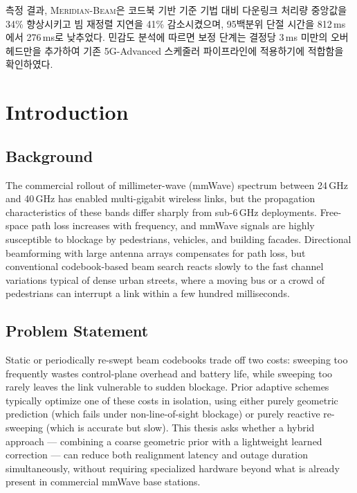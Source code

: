 \documentclass[12pt,a4paper]{report}
\begin{document}
\vspace{0.3cm}
\noindent 측정 결과, \textsc{Meridian-Beam}은 코드북 기반 기준 기법 대비
다운링크 처리량 중앙값을 34\% 향상시키고 빔 재정렬 지연을 41\% 감소시켰으며,
95백분위 단절 시간을 812\,ms에서 276\,ms로 낮추었다. 민감도 분석에 따르면
보정 단계는 결정당 3\,ms 미만의 오버헤드만을 추가하여 기존 5G-Advanced
스케줄러 파이프라인에 적용하기에 적합함을 확인하였다.

\clearpage

\tableofcontents
\clearpage
\listoftables
\clearpage
\listoffigures

\clearpage
{}
\setcounter{page}{1}

\chapter{Introduction}
\label{ch:intro}

\section{Background}
The commercial rollout of millimeter-wave (mmWave) spectrum between 24\,GHz
and 40\,GHz has enabled multi-gigabit wireless links, but the propagation
characteristics of these bands differ sharply from sub-6\,GHz deployments.
Free-space path loss increases with frequency, and mmWave signals are highly
susceptible to blockage by pedestrians, vehicles, and building facades.
Directional beamforming with large antenna arrays compensates for path loss,
but conventional codebook-based beam search reacts slowly to the fast channel
variations typical of dense urban streets, where a moving bus or a crowd of
pedestrians can interrupt a link within a few hundred milliseconds.

\section{Problem Statement}
Static or periodically re-swept beam codebooks trade off two costs: sweeping
too frequently wastes control-plane overhead and battery life, while sweeping
too rarely leaves the link vulnerable to sudden blockage. Prior adaptive
schemes typically optimize one of these costs in isolation, using either
purely geometric prediction (which fails under non-line-of-sight blockage) or
purely reactive re-sweeping (which is accurate but slow). This thesis asks
whether a hybrid approach --- combining a coarse geometric prior with a
lightweight learned correction --- can reduce both realignment latency and
outage duration simultaneously, without requiring specialized hardware beyond
what is already present in commercial mmWave base stations.
\end{document}
